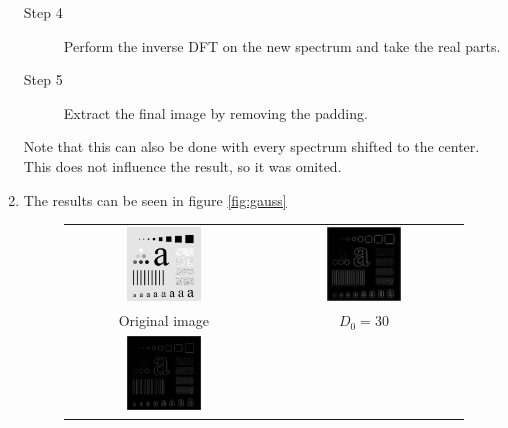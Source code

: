 \documentclass[a4paper]{article}
\begin{document}
\begin{enumerate}
\begin{description}
\item[Step 4] Perform the inverse DFT on the new spectrum and take the real parts.
\item[Step 5] Extract the final image by removing the padding.
\end{description}
Note that this can also be done with every spectrum shifted to the center.
This does not influence the result, so it was omited.

\item
The results can be seen in figure \ref{fig:gauss}
\begin{figure}[H]
\centering
\begin{tabular}{cc}
    \includegraphics[width=0.4\textwidth]{../lab2ex1/characters.png} &
    \includegraphics[width=0.4\textwidth]{../lab2ex2/characters-GHPF-D30.png} \\
    Original image & $D_{0} = 30$ \\
    \includegraphics[width=0.4\textwidth]{../lab2ex2/characters-GHPF-D60.png} &

\end{tabular}
\end{figure}
\end{enumerate}
\end{document}
